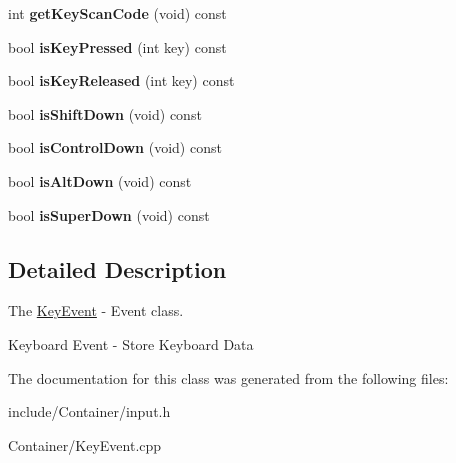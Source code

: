\begin{DoxyCompactItemize}
\item 
\hypertarget{classEngine_1_1KeyEvent_a557aa8233b0d677e9c3c897cdc948beb}{}int {\bfseries get\+Key\+Scan\+Code} (void) const \label{classEngine_1_1KeyEvent_a557aa8233b0d677e9c3c897cdc948beb}

\item 
\hypertarget{classEngine_1_1KeyEvent_abf4230e11f07aaf9df685e03e46b6387}{}bool {\bfseries is\+Key\+Pressed} (int key) const \label{classEngine_1_1KeyEvent_abf4230e11f07aaf9df685e03e46b6387}

\item 
\hypertarget{classEngine_1_1KeyEvent_a170b8d7c44c1590fac770da6b98e69dc}{}bool {\bfseries is\+Key\+Released} (int key) const \label{classEngine_1_1KeyEvent_a170b8d7c44c1590fac770da6b98e69dc}

\item 
\hypertarget{classEngine_1_1KeyEvent_ade946384e7d384d6b3616f528f6f21a9}{}bool {\bfseries is\+Shift\+Down} (void) const \label{classEngine_1_1KeyEvent_ade946384e7d384d6b3616f528f6f21a9}

\item 
\hypertarget{classEngine_1_1KeyEvent_ab0f661f414f426376f17b00007943ce3}{}bool {\bfseries is\+Control\+Down} (void) const \label{classEngine_1_1KeyEvent_ab0f661f414f426376f17b00007943ce3}

\item 
\hypertarget{classEngine_1_1KeyEvent_a041c7d5e1ffb529dce4316383ef94162}{}bool {\bfseries is\+Alt\+Down} (void) const \label{classEngine_1_1KeyEvent_a041c7d5e1ffb529dce4316383ef94162}

\item 
\hypertarget{classEngine_1_1KeyEvent_a87774477162a9c93ba93f06bc6d4b6a4}{}bool {\bfseries is\+Super\+Down} (void) const \label{classEngine_1_1KeyEvent_a87774477162a9c93ba93f06bc6d4b6a4}

\end{DoxyCompactItemize}


\subsection{Detailed Description}
The \hyperlink{classEngine_1_1KeyEvent}{Key\+Event} -\/ Event class. 

Keyboard Event -\/ Store Keyboard Data 

The documentation for this class was generated from the following files\+:\begin{DoxyCompactItemize}
\item 
include/\+Container/input.\+h\item 
Container/Key\+Event.\+cpp\end{DoxyCompactItemize}
